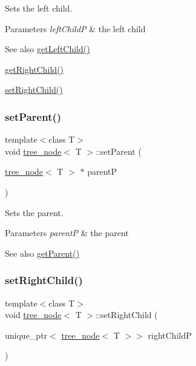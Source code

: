 Sets the left child. 
\begin{DoxyParams}{Parameters}
{\em left\+ChildP} & the left child \\
\hline
\end{DoxyParams}
\begin{DoxySeeAlso}{See also}
\hyperlink{classtree__node_ae161b70a3780e0cb3ecd4b57acc9e2d1}{get\+Left\+Child()} 

\hyperlink{classtree__node_a5e584d47f2c11941fe0406836fe50159}{get\+Right\+Child()} 

\hyperlink{classtree__node_afea4c6595dafba65b5c4e59ca3da30f3}{set\+Right\+Child()} 
\end{DoxySeeAlso}
\mbox{\label{classtree__node_a1fe75baae3a5d9caa9cb886c54c291e2}} 
\subsubsection{\texorpdfstring{set\+Parent()}{setParent()}}
{\footnotesize\ttfamily template$<$class T$>$ \\
void \hyperlink{classtree__node}{tree\+\_\+node}$<$ T $>$\+::set\+Parent (\begin{DoxyParamCaption}\item[{\hyperlink{classtree__node}{tree\+\_\+node}$<$ T $>$ $\ast$}]{parentP }\end{DoxyParamCaption})\hspace{0.3cm}{\ttfamily [inline]}}

Sets the parent. 
\begin{DoxyParams}{Parameters}
{\em parentP} & the parent \\
\hline
\end{DoxyParams}
\begin{DoxySeeAlso}{See also}
\hyperlink{classtree__node_aa17e609b57f77bb5446d83c964409ac4}{get\+Parent()} 
\end{DoxySeeAlso}
\mbox{\label{classtree__node_afea4c6595dafba65b5c4e59ca3da30f3}} 
\subsubsection{\texorpdfstring{set\+Right\+Child()}{setRightChild()}}
{\footnotesize\ttfamily template$<$class T$>$ \\
void \hyperlink{classtree__node}{tree\+\_\+node}$<$ T $>$\+::set\+Right\+Child (\begin{DoxyParamCaption}\item[{unique\+\_\+ptr$<$ \hyperlink{classtree__node}{tree\+\_\+node}$<$ T $>$$>$}]{right\+ChildP }\end{DoxyParamCaption})\hspace{0.3cm}{\ttfamily [inline]}}

